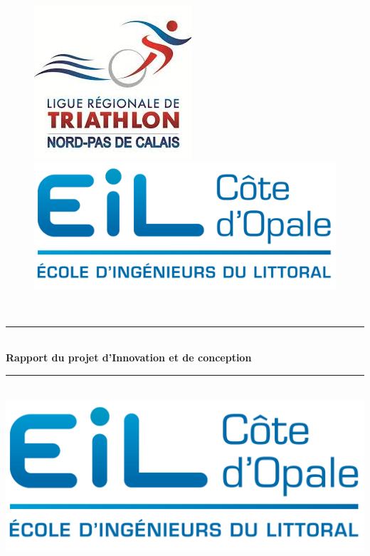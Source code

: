 \documentclass[12pt,a4paper]{report}
\newcommand{\HRule}{\rule{\linewidth}{0.5mm}}
\begin{document}
	

\begin{titlepage}
  \begin{sffamily}
  \begin{center}
\begin{figure}
\includegraphics[scale=0.8]{img/logo_png.png} \hfill
\includegraphics[scale=0.7]{img/eilco.png} 
\end{figure}

    \textsc{\Large }\\[1.5cm]

    \HRule \\[0.4cm]
    { \huge \bfseries Rapport du projet d'Innovation et de conception\\[0.4cm] }

    \HRule \\[2cm]
    \includegraphics[scale=1]{img/logo.png}
    \\[2cm]


\end{center}
\end{sffamily}
\end{titlepage}
\end{document}
